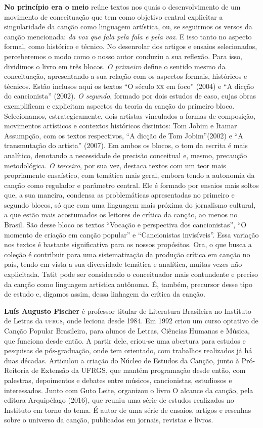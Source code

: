 \textbf{No princípio era o meio} reúne textos nos quais o desenvolvimento de um movimento de conceituação que tem como objetivo central explicitar a singularidade da canção como linguagem artística, ou, se seguirmos os versos da canção mencionada: \textit{da voz que fala pela fala e pela voz}. E isso tanto no aspecto formal, como histórico e técnico. No desenrolar dos artigos e ensaios selecionados, perceberemos o modo como o nosso autor conduziu a sua reflexão. Para isso, dividimos o livro em três blocos. \textit{O primeiro} define o sentido mesmo da conceituação, apresentando a sua relação com os aspectos formais, históricos e técnicos. Estão inclusos aqui os textos ``O século \textsc{xx} em foco'' (2004) e ``A dicção do cancionista'' (2002). \textit{O segundo}, formado por dois estudos de caso, cujas obras exemplificam e explicitam aspectos da teoria da canção do primeiro bloco. Selecionamos, estrategicamente, dois artistas vinculados a formas de composição, movimentos artísticos e contextos históricos distintos: Tom Jobim e Itamar Assumpção, com os textos respectivos, ``A dicção de Tom Jobim''(2002) e ``A transmutação do artista'' (2007). Em ambos os blocos, o tom da escrita é mais analítico, denotando a necessidade de precisão conceitual e, mesmo, precaução metodológica. \textit{O terceiro}, por sua vez, destaca textos com um teor mais propriamente ensaístico, com temática mais geral, embora tendo a autonomia da canção como regulador e parâmetro central. Ele é formado por ensaios mais soltos que, a sua maneira, condensa as problemáticas apresentadas no primeiro e segundo blocos, só que com uma linguagem mais próxima do jornalismo cultural, a que estão mais acostumados os leitores de crítica da canção, ao menos no Brasil. São desse bloco os textos ``Vocação e perspectiva dos cancionistas'', ``O momento de criação em canção popular'' e ``Cancionistas invisíveis''. Essa variação nos textos é bastante significativa para os nossos propósitos. Ora, o que busca a coleção é contribuir para uma sistematização da produção crítica em canção no país, tendo em vista a sua diversidade temática e analítica, muitas vezes não explicitada. Tatit pode ser considerado o conceituador mais contundente e preciso da canção como linguagem artística autônoma. É, também, precursor desse tipo de estudo e, digamos assim, dessa linhagem da crítica da canção.

\textbf{Luís Augusto Fischer} é professor titular de Literatura Brasileira no Instituto de Letras da \textsc{ufrgs}, onde leciona desde 1984. Em 1992 criou um curso optativo de Canção Popular Brasileira, para alunos de Letras, Ciências Humanas e Música, que funciona desde então. A partir dele, criou-se uma abertura para estudos e pesquisas de pós-graduação, onde tem orientado, com trabalhos realizados já há duas décadas. Articulou a criação do Núcleo de Estudos da Canção, junto à Pró-Reitoria de Extensão da UFRGS, que mantém programação desde então, com palestras, depoimentos e debates entre músicos, cancionistas, estudiosos e interessados. Junto com Guto Leite, organizou o livro O alcance da canção, pela editora Arquipélago (2016), que reuniu uma série de estudos realizados no Instituto em torno do tema. É autor de uma série de ensaios, artigos e resenhas sobre o universo da canção, publicados em jornais, revistas e livros.


\endgroup
\pagebreak